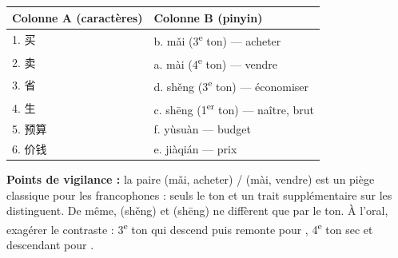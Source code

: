 \documentclass[11pt]{article}
\newcommand{\zh}[1]{\ifmmode\text{#1}\else{#1}\fi}
\begin{document}
\begin{corrige}
\begin{center}
\begin{tabularx}{\linewidth}{|X|X|}
\hline
\rowcolor{popblueL} Colonne A (caractères) & Colonne B (pinyin) \\
\hline
1. 买 & b. mǎi (3\textsuperscript{e} ton) — acheter \\
\hline
2. 卖 & a. mài (4\textsuperscript{e} ton) — vendre \\
\hline
3. 省 & d. shěng (3\textsuperscript{e} ton) — économiser \\
\hline
4. 生 & c. shēng (1\textsuperscript{er} ton) — naître, brut \\
\hline
5. 预算 & f. yùsuàn — budget \\
\hline
6. 价钱 & e. jiàqián — prix \\
\hline
\end{tabularx}
\end{center}
\textbf{Points de vigilance :} la paire \zh{买} (mǎi, acheter) / \zh{卖} (mài, vendre) est un piège classique pour les francophones : seuls le ton et un trait supplémentaire sur \zh{卖} les distinguent. De même, \zh{省} (shěng) et \zh{生} (shēng) ne diffèrent que par le ton. À l'oral, exagérer le contraste : 3\textsuperscript{e} ton qui descend puis remonte pour \zh{买}, 4\textsuperscript{e} ton sec et descendant pour \zh{卖}.
\end{corrige}
\end{document}
